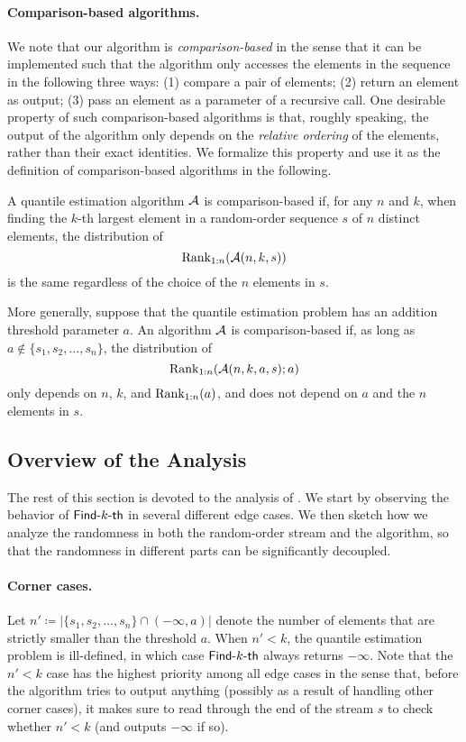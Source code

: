 \paragraph{Comparison-based algorithms.} We note that our algorithm is \emph{comparison-based} in the sense that it can be implemented such that the algorithm only accesses the elements in the sequence in the following three ways: (1) compare a pair of elements; (2) return an element as output; (3) pass an element as a parameter of a recursive call. One desirable property of such comparison-based algorithms is that, roughly speaking, the output of the algorithm only depends on the \emph{relative ordering} of the elements, rather than their exact identities. We formalize this property and use it as the definition of comparison-based algorithms in the following.

\begin{definition}\label{def:comparison-based}
    A quantile estimation algorithm $\mathcal{A}$ is comparison-based if, for any $n$ and $k$, when finding the $k$-th largest element in a random-order sequence $s$ of $n$ distinct elements, the distribution of
    \[
        \mathrm{Rank}_{1:n}(\mathcal{A}(n, k, s))
    \]
    is the same regardless of the choice of the $n$ elements in $s$.

    More generally, suppose that the quantile estimation problem has an addition threshold parameter $a$. An algorithm $\mathcal{A}$ is comparison-based if, as long as $a \notin \{s_1, s_2, \ldots, s_n\}$, the distribution of
    \[
        \mathrm{Rank}_{1:n}(\mathcal{A}(n, k, a, s); a)
    \]
    only depends on $n$, $k$, and $\mathrm{Rank}_{1:n}(a)$, and does not depend on $a$ and the $n$ elements in $s$.
\end{definition}

\subsection{Overview of the Analysis}\label{sec:approx-analysis-overview}
The rest of this section is devoted to the analysis of . We start by observing the behavior of $\textsf{Find-}k\textsf{-th}$ in several different edge cases. We then sketch how we analyze the randomness in both the random-order stream and the algorithm, so that the randomness in different parts can be significantly decoupled.

\paragraph{Corner cases.} Let $n' \coloneqq |\{s_1, s_2, \ldots, s_n\} \cap (-\infty, a)|$ denote the number of elements that are strictly smaller than the threshold $a$. When $n' < k$, the quantile estimation problem is ill-defined, in which case $\textsf{Find-}k\textsf{-th}$ always returns $-\infty$. Note that the $n' < k$ case has the highest priority among all edge cases in the sense that, before the algorithm tries to output anything (possibly as a result of handling other corner cases), it makes sure to read through the end of the stream $s$ to check whether $n' < k$ (and outputs $-\infty$ if so).

